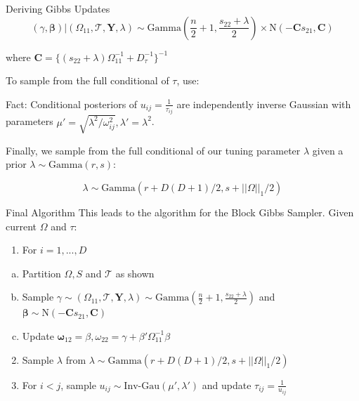 \documentclass[
  ignorenonframetext,
]{beamer}
\providecommand{\tightlist}{%
  \setlength{\itemsep}{0pt}\setlength{\parskip}{0pt}}
\begin{document}
\begin{frame}{Deriving Gibbs Updates}
\label{deriving-gibbs-updates-2}
\[(\gamma, \boldsymbol{\beta})|(\Omega_{11}, \mathcal{T}, \textbf{Y}, \lambda) \sim
\textrm{Gamma}(\frac{n}{2}+1, \frac{s_{22}+\lambda}{2}) \times 
\textrm{N}(-\textbf{C}s_{21}, \textbf{C})\]

where
\(\textbf{C} = \{(s_{22}+\lambda)\Omega_{11}^{-1} + D_{\tau}^{-1}\}^{-1}\)

To sample from the full conditional of \(\tau\), use:

Fact: Conditional posteriors of \(u_{ij} = \frac{1}{\tau_{ij}}\) are
independently inverse Gaussian with parameters
\(\mu'=\sqrt{\lambda^2 / \omega_{ij}^2}, \lambda'=\lambda^2\).

Finally, we sample from the full conditional of our tuning parameter
\(\lambda\) given a prior \(\lambda \sim \textrm{Gamma}(r, s)\):

\[\lambda \sim \textrm{Gamma}(r + D(D+1)/2, s + ||\Omega||_1/2)\]
\end{frame}

\begin{frame}{Final Algorithm}
\label{final-algorithm}
This leads to the algorithm for the Block Gibbs Sampler. Given current
\(\Omega\) and \(\tau\):

\begin{enumerate}
\tightlist
\item
  For \(i=1,...,D\)
\end{enumerate}

\begin{enumerate}
[(a)]
\tightlist
\item
  Partition \(\Omega,S\) and \(\mathcal{T}\) as shown
\item
  Sample
  \(\gamma \sim (\Omega_{11}, \mathcal{T}, \textbf{Y}, \lambda) \sim \textrm{Gamma}(\frac{n}{2}+1, \frac{s_{22}+\lambda}{2})\)
  and
  \(\boldsymbol{\beta} \sim \textrm{N}(-\textbf{C}s_{21}, \textbf{C})\)
\item
  Update
  \(\boldsymbol{\omega}_{12}=\beta, \omega_{22} = \gamma + \beta'\Omega_{11}^{-1}\beta\)
\end{enumerate}

\begin{enumerate}
\setcounter{enumi}{1}
\item
  Sample \(\lambda\) from
  \(\lambda \sim \textrm{Gamma}(r + D(D+1)/2, s + ||\Omega||_1/2)\)
\item
  For \(i<j\), sample \(u_{ij} \sim \textrm{Inv-Gau}(\mu',\lambda')\)
  and update \(\tau_{ij} = \frac{1}{u_{ij}}\)
\end{enumerate}
\end{frame}
\end{document}
